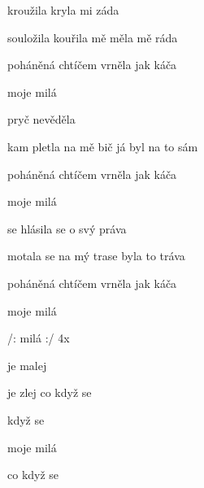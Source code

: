 

\zs
{} kroužila kryla mi záda

souložila kouřila mě měla mě ráda

poháněná chtíčem vrněla jak káča

moje milá  
\ks

\zs
{} pryč nevěděla

kam pletla na mě bič já byl na to sám

poháněná chtíčem vrněla jak káča

moje milá 
\ks

\zs
{} se hlásila se o svý práva

motala se na mý trase byla to tráva

poháněná chtíčem vrněla jak káča

moje milá  
\ks

\zr
/:  milá   :/ 4x

  

je malej  

  

je zlej co když se 

 když se 

moje milá  

co když se 
\kr

\kp



















